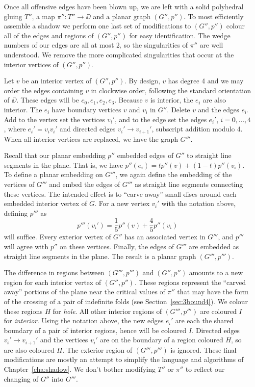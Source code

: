 \label{alg:finalmod}
Once all offensive edges have been blown up, we are left with a solid polyhedral gluing $T''$, a map $\pi'':T''\to \DD$ and a planar graph $(G'',p'')$.
To most efficiently assemble a shadow we perform one last set of modifications to $(G'',p'')$ colour all of the edges and regions of $(G'',p'')$ for easy identification.
The wedge numbers of our edges are all at most 2, so the singularities of $\pi''$ are well understood.
We remove the more complicated singularities that occur at the interior vertices of $(G'',p'')$.

Let $v$ be an interior vertex of $(G'',p'')$.
By design, $v$ has degree 4 and we may order the edges containing $v$ in clockwise order, following the standard orientation of $\DD$.
These edges will be $e_0,e_1,e_2,e_3$.
Because $v$ is interior, the $e_i$ are also interior.
The $e_i$ have boundary vertices $v$ and $v_i$ in $G''$.
Delete $v$ and the edges $e_i$.
Add to the vertex set the vertices $v_i'$, and to the edge set the edges $e_i'$, $i=0,\dots,4$, where $e_i'=v_i v_i'$ and directed edges $v_{i}'\to v_{i+1}'$, subscript addition modulo 4.
When all interior vertices are replaced, we have the graph $G'''$.

Recall that our planar embedding $p''$ embedded edges of $G''$ to straight line segments in the plane.
That is, we have $p''(e_i)=tp''(v)+(1-t)p''(v_i)$.
To define a planar embedding on $G'''$, we again define the embedding of the vertices of $G'''$ and embed the edges of $G'''$ as straight line segments connecting these vertices.
The intended effect is to ``carve away'' small discs around each embedded interior vertex of $G$.
For a new vertex $v_i'$ with the notation above, defining $p'''$ as
\[
  p'''(v_i')=\frac{1}{5}p''(v) + \frac{4}{5}p''(v_i)
\]
will suffice.
Every exterior vertex of $G''$ has an associated vertex in $G'''$, and $p'''$ will agree with $p''$ on these vertices.
Finally, the edges of $G'''$ are embedded as straight line segments in the plane.
The result is a planar graph $(G''',p''')$.

The difference in regions between $(G''',p''')$  and $(G'',p'')$ amounts to a new region for each interior vertex of $(G'',p'')$.
These regions represent the ``carved away'' portions of the plane near the critical values of $\pi''$ that may have the form of the crossing of a pair of indefinite folds (see Section~\ref{sec:3bound4}).
We colour these regions $H$ for \emph{hole}.
All other interior regions of $(G''',p''')$ are coloured $I$ for \emph{interior}.
Using the notation above, the new edges $e_i'$ are each the shared boundary of a pair of interior regions, hence will be coloured $I$.
Directed edges $v_{i}'\to v_{i+1}'$ and the vertices $v_i'$ are on the boundary of a region coloured $H$, so are also coloured $H$.
The exterior region of $(G''',p''')$ is ignored.
These final modifications are mostly an attempt to simplify the language and algorithms of Chapter~\ref{cha:shadow}.
We don't bother modifying $T''$ or $\pi''$ to reflect our changing of $G''$ into $G'''$.

